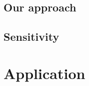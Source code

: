 \documentclass{bmcart}
\begin{document}
\subsection{Our approach}

\subsection{Sensitivity}

\section{Application}


\pagebreak

\end{document}
